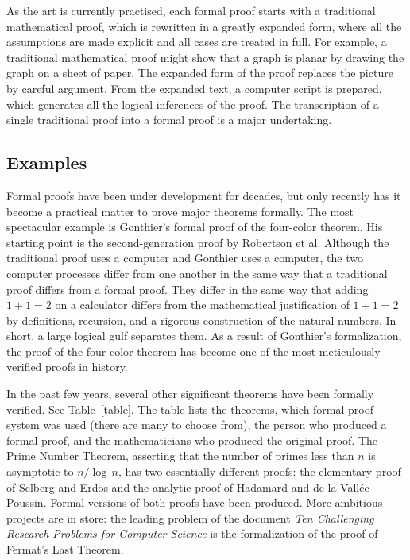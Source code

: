 \documentclass{llncs}
\begin{document}
As the art is currently practised, each formal proof starts with a traditional
mathematical proof, which is rewritten in a greatly expanded form, where all the
assumptions are made explicit and all cases are treated in full.
For example, a traditional mathematical proof might show that a graph is
planar by drawing the graph on a sheet of paper.  The expanded form of
the proof  replaces the picture by careful argument.  From the
expanded text, a computer script is prepared, which generates all
the logical inferences of the proof.  The transcription of a single traditional
proof into a formal proof is a major undertaking.

\subsection{Examples}

Formal proofs have been under development for decades, but only recently
has it become a practical matter to prove major theorems formally.
The most spectacular
example is Gonthier's formal proof of the four-color theorem.  His
starting point is the second-generation 
proof by Robertson et al.  Although the traditional proof uses a computer
and Gonthier uses a computer,  the two computer processes
differ from one another in the same way that a traditional proof differs
from a formal proof.  They differ in the same way that adding $1+1=2$ on
a calculator differs from the mathematical
justification of $1+1=2$ by definitions,
recursion, and a rigorous construction of the natural numbers.  
In short, a large logical gulf separates them.
As a result of Gonthier's formalization,
the proof of the four-color theorem has become one of the most meticulously verified proofs
in history.

In the past few years, several other significant theorems have been
formally verified. See Table~\ref{table}.  The table lists the
theorems, which formal proof system was used (there are many to choose from), the person who
produced a formal proof, and the mathematicians who produced the
original proof.  The Prime Number Theorem, asserting that the
number of primes less than $n$ is asymptotic to $n/\log\,n$, has
two essentially different proofs: the elementary proof of
Selberg and Erd\"os and the analytic proof of Hadamard and
de la Vall\'ee Poussin.  Formal versions of both proofs have
been produced.   More ambitious projects are in store:
 the leading problem of the document {\it Ten Challenging
Research Problems for Computer Science} is the formalization
of the proof of Fermat's Last Theorem.
\end{document}
